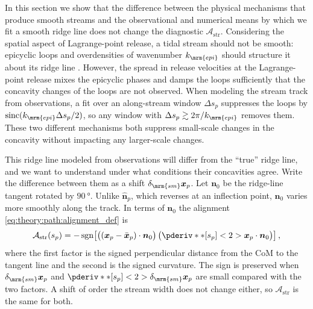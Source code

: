 \documentclass[linenumbers,twocolumn]{aastex701}
\renewcommand{\mbf}[1]{\boldsymbol{#1}}
\newcommand{\xvec}{\mbf{x}}  %
\newcommand{\nhat}{\hat{\mbf{n}}}  %
\newcommand{\xcom}{\proj{\bar{\xvec}}}  %
\newcommand{\Astr}{\mathcal{A}_{\mathrm{str}}}
\newcommand{\sarc}{s}  %
\newcommand{\proj}[1]{{#1}_{p}}  %
\newcommand{\xsky}{\proj{\xvec}}  %
\newcommand{\nphat}{\proj{\nhat}}  %
\newcommand{\ssky}{\proj{\sarc}} %
\begin{document}
        In this section we show that the difference between the physical mechanisms that produce smooth streams and the observational and numerical means by which we fit a smooth ridge line does not change the diagnostic $\Astr$. %
        Considering the spatial aspect of Lagrange-point release, a tidal stream should not be smooth: epicyclic loops and overdensities of wavenumber $k_{\mrm{epi}}$ should structure it about its ridge line \citep{Kupper+:2010:TidalTailsStar,Kupper+:2012:MoreStructureTidal}. %
        However, the spread in release velocities at the Lagrange-point release mixes the epicyclic phases and damps the loops \citep{Bovy:2014:DynamicalModelingTidal} sufficiently that the concavity changes of the loops are not observed. %
        When modeling the stream track from observations, a fit over an along-stream window $\Delta \ssky$ suppresses the loops by $\operatorname{sinc}(k_{\mrm{epi}}\Delta \ssky/2)$, so any window with $\Delta \ssky \gtrsim 2\pi/k_{\mrm{epi}}$ removes them. %
        These two different mechanisms both suppress small-scale changes in the concavity without impacting any larger-scale changes. %

        This ridge line modeled from observations will differ from the ``true'' ridge line, and we want to understand under what conditions their concavities agree. %
        Write the difference between them as a shift $\delta_{\mrm{sm}}\xsky$. %
        Let $\mbf{n}_0$ be the ridge-line tangent rotated by $\qty[retain-explicit-plus]{+90}{\degree}$. %
        Unlike $\nphat$, which reverses at an inflection point, $\mbf{n}_0$ varies more smoothly along the track. %
        In terms of $\mbf{n}_0$ the alignment \cref{eq:theory:path:alignment_def} is %
        \begin{equation}\label{eq:robust:smoothing:alignment_sign}
            \Astr(\ssky)
            =
            -\operatorname{sgn}\!\left[
                \bigl((\xsky-\xcom)\cdot\mbf{n}_0\bigr)\,
                \bigl(\pderiv**[\ssky]<2>{\xsky}\cdot\mbf{n}_0\bigr)
            \right], %
        \end{equation}
        where the first factor is the signed perpendicular distance from the \gls{CoM} to the tangent line and the second is the signed curvature. %
        The sign is preserved when $\delta_{\mrm{sm}}\xsky$ and $\pderiv**[\ssky]<2>{\delta_{\mrm{sm}}\xsky}$ are small compared with the two factors. %
        A shift of order the stream width does not change either, so $\Astr$ is the same for both. %
\end{document}
